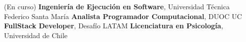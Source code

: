 %
%
%


\begin{scholarship}
					{(En curso) \textbf{Ingeniería de Ejecución en Software}, Universidad Técnica Federico Santa María}
					{\textbf{Analista Programador Computacional}, DUOC UC}
					{\textbf{FullStack Developer}, Desafío LATAM}
					{\textbf{Licenciatura en Psicología}, Universidad de Chile}
\end{scholarship}